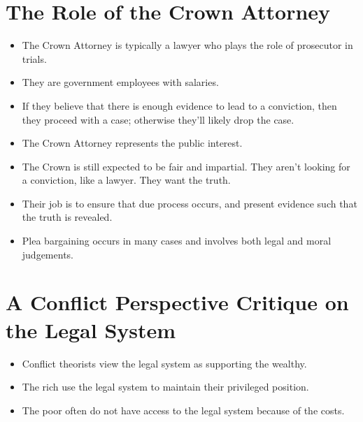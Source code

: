 \documentclass{article}
\begin{document}
\section{The Role of the Crown Attorney}
\begin{itemize}
    \item The Crown Attorney is typically a lawyer who plays the role of prosecutor in trials.
    \item They are government employees with salaries.
    \item If they believe that there is enough evidence to lead to a conviction, then they proceed with a case; otherwise they'll likely drop the case.
    \item The Crown Attorney represents the public interest.
    \item The Crown is still expected to be fair and impartial.  They aren't looking for a conviction, like a lawyer.  They want the truth.
    \item Their job is to ensure that due process occurs, and present evidence such that the truth is revealed.
    \item Plea bargaining occurs in many cases and involves both legal and moral judgements.
\end{itemize}

\section{A Conflict Perspective Critique on the Legal System}
\begin{itemize}
    \item Conflict theorists view the legal system as supporting the wealthy.
    \item The rich use the legal system to maintain their privileged position.
    \item The poor often do not have access to the legal system because of the costs.
\end{itemize}
\end{document}
